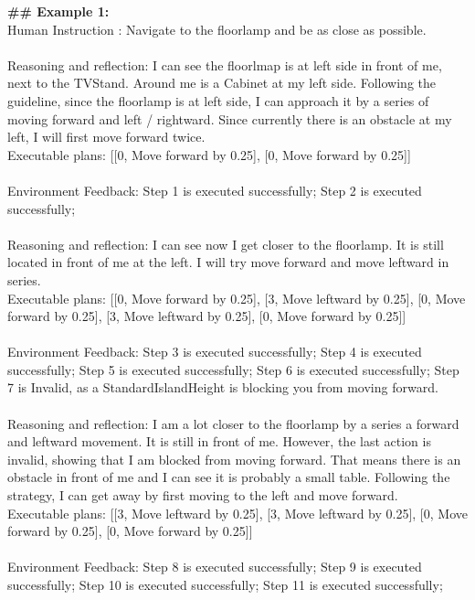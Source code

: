 \begin{tcolorbox}[colback=gray!5!white, colframe=gray!75!black, 
title=In-context examples for EB-Navigation, boxrule=0.5mm, width=\textwidth, arc=3mm, auto outer arc=true]
\textbf{\#\# Example 1:}\\
Human Instruction : Navigate to the floorlamp and be as close as possible.\\
\\
Reasoning and reflection: I can see the floorlmap is at left side in front of me, next to the TVStand. Around me is a Cabinet at my left side. Following the guideline, since the floorlamp is at left side, I can approach it by a series of moving forward and left / rightward. Since currently there is an obstacle at my left, I will first move forward twice.\\
Executable plans: [[0, Move forward by 0.25], [0, Move forward by 0.25]]\\
\\
Environment Feedback: Step 1 is executed successfully; Step 2 is executed successfully;\\
\\
Reasoning and reflection: I can see now I get closer to the floorlamp. It is still located in front of me at the left. I will try move forward and move leftward in series.\\
Executable plans: [[0, Move forward by 0.25], [3, Move leftward by 0.25], [0, Move forward by 0.25], [3, Move leftward by 0.25], [0, Move forward by 0.25]]\\
\\
Environment Feedback: Step 3 is executed successfully; Step 4 is executed successfully; Step 5 is executed successfully; Step 6 is executed successfully; Step 7 is Invalid, as a StandardIslandHeight is blocking you from moving forward.\\
\\
Reasoning and reflection: I am a lot closer to the floorlamp by a series a forward and leftward movement. It is still in front of me. However, the last action is invalid, showing that I am blocked from moving forward. That means there is an obstacle in front of me and I can see it is probably a small table. Following the strategy, I can get away by first moving to the left and move forward. \\
Executable plans: [[3, Move leftward by 0.25], [3, Move leftward by 0.25], [0, Move forward by 0.25], [0, Move forward by 0.25]]\\
\\
Environment Feedback: Step 8 is executed successfully; Step 9 is executed successfully; Step 10 is executed successfully; Step 11 is executed successfully;\\

\end{tcolorbox}
